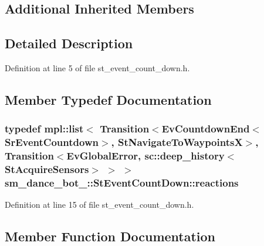 \subsection*{Additional Inherited Members}


\subsection{Detailed Description}


Definition at line 5 of file st\+\_\+event\+\_\+count\+\_\+down.\+h.



\subsection{Member Typedef Documentation}
\subsubsection[{\texorpdfstring{reactions}{reactions}}]{\setlength{\rightskip}{0pt plus 5cm}typedef mpl\+::list$<$ Transition$<$Ev\+Countdown\+End$<$Sr\+Event\+Countdown$>$, {\bf St\+Navigate\+To\+WaypointsX}$>$, Transition$<${\bf Ev\+Global\+Error}, sc\+::deep\+\_\+history$<${\bf St\+Acquire\+Sensors}$>$ $>$ $>$ {\bf sm\+\_\+dance\+\_\+bot\+\_\+::\+St\+Event\+Count\+Down\+::reactions}}\hypertarget{structsm__dance__bot__3_1_1StEventCountDown_a381755fc445b431bc0bbbf78bb53b274}{}\label{structsm__dance__bot__3_1_1StEventCountDown_a381755fc445b431bc0bbbf78bb53b274}


Definition at line 15 of file st\+\_\+event\+\_\+count\+\_\+down.\+h.



\subsection{Member Function Documentation}
